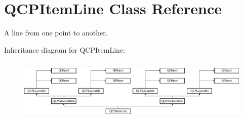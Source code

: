 \hypertarget{class_q_c_p_item_line}{}\section{Q\+C\+P\+Item\+Line Class Reference}
\label{class_q_c_p_item_line}


A line from one point to another.  


Inheritance diagram for Q\+C\+P\+Item\+Line\+:\begin{figure}[H]
\begin{center}
\leavevmode
\includegraphics[height=3.017241cm]{class_q_c_p_item_line}
\end{center}
\end{figure}
